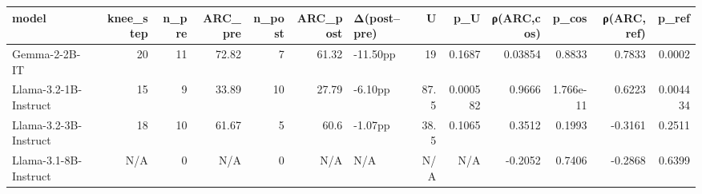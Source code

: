 \begin{tabular}{lrrrrrlrrrrrr}
\toprule
model & knee_step & n_pre & ARC_pre & n_post & ARC_post & Δ(post–pre) & U & p_U & ρ(ARC,cos) & p_cos & ρ(ARC,ref) & p_ref \\
\midrule
Gemma-2-2B-IT & 20 & 11 & 72.82 & 7 & 61.32 & -11.50pp & 19 & 0.1687 & 0.03854 & 0.8833 & 0.7833 & 0.0002 \\
Llama-3.2-1B-Instruct & 15 & 9 & 33.89 & 10 & 27.79 & -6.10pp & 87.5 & 0.000582 & 0.9666 & 1.766e-11 & 0.6223 & 0.004434 \\
Llama-3.2-3B-Instruct & 18 & 10 & 61.67 & 5 & 60.6 & -1.07pp & 38.5 & 0.1065 & 0.3512 & 0.1993 & -0.3161 & 0.2511 \\
Llama-3.1-8B-Instruct & N/A & 0 & N/A & 0 & N/A & N/A & N/A & N/A & -0.2052 & 0.7406 & -0.2868 & 0.6399 \\
\bottomrule
\end{tabular}
